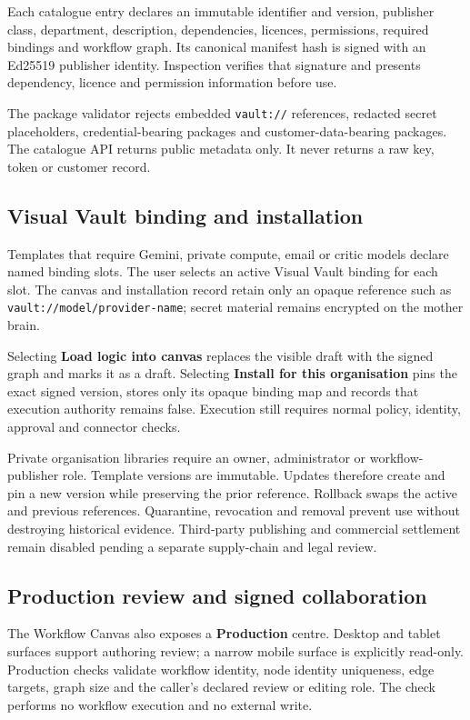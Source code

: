 Each catalogue entry declares an immutable identifier and version, publisher class, department,
description, dependencies, licences, permissions, required bindings and workflow graph. Its
canonical manifest hash is signed with an Ed25519 publisher identity. Inspection verifies that
signature and presents dependency, licence and permission information before use.

The package validator rejects embedded \texttt{vault://} references, redacted secret placeholders,
credential-bearing packages and customer-data-bearing packages. The catalogue API returns public
metadata only. It never returns a raw key, token or customer record.

\subsection{Visual Vault binding and installation}

Templates that require Gemini, private compute, email or critic models declare named binding slots.
The user selects an active Visual Vault binding for each slot. The canvas and installation record
retain only an opaque reference such as \texttt{vault://model/provider-name}; secret material
remains encrypted on the mother brain.

Selecting \textbf{Load logic into canvas} replaces the visible draft with the signed graph and
marks it as a draft. Selecting \textbf{Install for this organisation} pins the exact signed version,
stores only its opaque binding map and records that execution authority remains false. Execution still
requires normal policy, identity, approval and connector checks.

Private organisation libraries require an owner, administrator or workflow-publisher role. Template
versions are immutable. Updates therefore create and pin a new version while preserving the prior
reference. Rollback swaps the active and previous references. Quarantine, revocation and removal
prevent use without destroying historical evidence. Third-party publishing and commercial
settlement remain disabled pending a separate supply-chain and legal review.

\subsection{Production review and signed collaboration}

The Workflow Canvas also exposes a \textbf{Production} centre. Desktop and tablet surfaces support
authoring review; a narrow mobile surface is explicitly read-only. Production checks validate
workflow identity, node identity uniqueness, edge targets, graph size and the caller's declared
review or editing role. The check performs no workflow execution and no external write.

